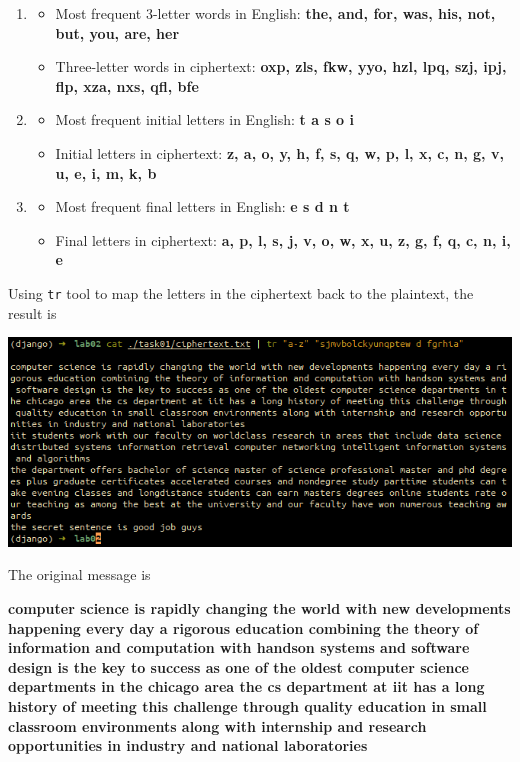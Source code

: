 \documentclass{article}
\begin{document}
\begin{enumerate}
    \item
        \begin{itemize}
            \item Most frequent 3-letter words in English: \textbf{the, and, for, was, his, not, but, you, are, her}
            \item Three-letter words in ciphertext: \textbf{oxp, zls, fkw, yyo, hzl, lpq, szj, ipj, flp, xza, nxs, qfl, bfe}
        \end{itemize}
    \item
        \begin{itemize}
            \item Most frequent initial letters in English: \textbf{t a s o i}
            \item Initial letters in ciphertext: \textbf{z, a, o, y, h, f, s, q, w, p, l, x, c, n, g, v, u, e, i, m, k, b}
        \end{itemize}
    \item
        \begin{itemize}
            \item Most frequent final letters in English: \textbf{e s d n t}
            \item Final letters in ciphertext: \textbf{a, p, l, s, j, v, o, w, x, u, z, g, f, q, c, n, i, e}
        \end{itemize}
\end{enumerate}

Using \texttt{tr} tool to map the letters in the ciphertext back to the plaintext,
the result is

\begin{center}
    \includegraphics[scale=0.68]{task01_2.png}
\end{center}

The original message is

\textbf{computer science is rapidly changing the world with new developments happening
every day a rigorous education combining the theory of information and computation
with handson systems and software design is the key to success as one of the oldest
computer science departments in the chicago area the cs department at iit has a
long history of meeting this challenge through quality education in small classroom
environments along with internship and research opportunities in industry and national
laboratories}
\end{document}

